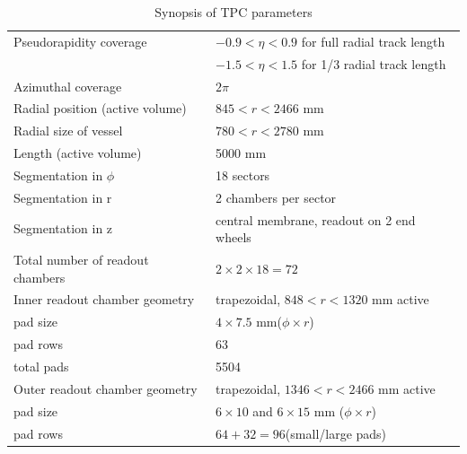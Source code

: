 \documentclass[12pt, a4paper]{article}
\begin{document}
\renewcommand{\arraystretch}{1.1}  %
\begin{table}[htb]               

\begin{center}
\caption{Synopsis of TPC parameters}
\vspace{4mm}
\begin{tabular}{|l|l|}\hline   
Pseudorapidity coverage & $-0.9<\eta<0.9$ for full radial track length\\
                        & $-1.5<\eta<1.5$ for 1/3 radial track length\\
Azimuthal coverage & $2\pi$ \\
Radial position (active volume) & $845<r<2466$ mm \\
Radial size of vessel           & $780<r<2780$ mm  \\
Length (active volume)          & 5000 mm \\
Segmentation in $\phi$		& 18 sectors\\
Segmentation in r		& 2 chambers per sector\\     
Segmentation in z		& central membrane, readout on 2
end wheels \\
Total number of readout chambers & $2\times2\times 18 = 72$ \\ \hline
Inner readout chamber geometry  &  trapezoidal, $ 848<r<1320$ mm active\\
\quad pad size                  & $4\times7.5$ mm\quad ($\phi\times r$)\\
\quad pad rows			& 63 \\
\quad total pads		& 5504 \\ \hline
Outer readout chamber geometry  &  trapezoidal, $ 1346<r<2466$ mm active \\
\quad pad size                  & $6\times10$ and $6\times15$ mm
         \quad ($\phi\times r$)\\
\quad pad rows			& $64+32=96$\quad (small/large pads) \\

\end{tabular}
\end{center}
\end{table}
\end{document}
